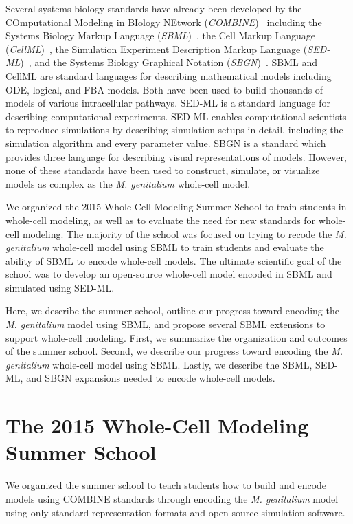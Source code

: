 \documentclass[journal,transmag]{IEEEtran}
\begin{document}
Several systems biology standards have already been developed by the COmputational Modeling in BIology NEtwork (\emph{COMBINE})~\cite{le2011meeting} including the Systems Biology Markup Language (\emph{SBML})~\cite{hucka2003}, the Cell Markup Language (\emph{CellML})~\cite{hedley_2001b}, the Simulation Experiment Description Markup Language (\emph{SED-ML})~\cite{sedml2011}, and the Systems Biology Graphical Notation (\emph{SBGN})~\cite{LeNovereHMMSS09}. SBML and CellML are standard languages for describing mathematical models including ODE, logical, and FBA models. Both have been used to build thousands of models of various intracellular pathways. SED-ML is a standard language for describing computational experiments. SED-ML enables computational scientists to reproduce simulations by describing simulation setups in detail, including the simulation algorithm and every parameter value. SBGN is a standard which provides three language for describing visual representations of models. However, none of these standards have been used to construct, simulate, or visualize models as complex as the \textit{M. genitalium} whole-cell model.

We organized the 2015 Whole-Cell Modeling Summer School to train students in whole-cell modeling, as well as to evaluate the need for new standards for whole-cell modeling. The majority of the school was focused on trying to recode the \textit{M. genitalium} whole-cell model using SBML to train students and evaluate the ability of SBML to encode whole-cell models. The ultimate scientific goal of the school was to develop an open-source whole-cell model encoded in SBML and simulated using SED-ML.

Here, we describe the summer school, outline our progress toward encoding the \textit{M. genitalium} model using SBML, and propose several SBML extensions to support whole-cell modeling.
First, we summarize the organization and outcomes of the summer school. 
Second, we describe our progress toward encoding the \textit{M. genitalium} whole-cell model using SBML. 
Lastly, we describe the SBML, SED-ML, and SBGN expansions needed to encode whole-cell models.

\section{The 2015 Whole-Cell Modeling Summer School}
We organized the summer school to teach students how to build and encode models using COMBINE standards through encoding the \textit{M. genitalium} model using only standard representation formats and open-source simulation software.
\end{document}
